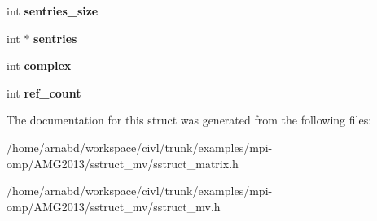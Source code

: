 \begin{DoxyCompactItemize}
\item 
\hypertarget{structhypre__SStructPMatrix_a423d9a3352a6af033e9e0a86a950365f}{}int {\bfseries sentries\+\_\+size}\label{structhypre__SStructPMatrix_a423d9a3352a6af033e9e0a86a950365f}

\item 
\hypertarget{structhypre__SStructPMatrix_a5994417873b971b4ec0cae0f9a2f2712}{}int $\ast$ {\bfseries sentries}\label{structhypre__SStructPMatrix_a5994417873b971b4ec0cae0f9a2f2712}

\item 
\hypertarget{structhypre__SStructPMatrix_ab6c60988eaf3e2bba1db4877bdac6088}{}int {\bfseries complex}\label{structhypre__SStructPMatrix_ab6c60988eaf3e2bba1db4877bdac6088}

\item 
\hypertarget{structhypre__SStructPMatrix_ab7d2b148ffecf7146647a79f8523179a}{}int {\bfseries ref\+\_\+count}\label{structhypre__SStructPMatrix_ab7d2b148ffecf7146647a79f8523179a}

\end{DoxyCompactItemize}


The documentation for this struct was generated from the following files\+:\begin{DoxyCompactItemize}
\item 
/home/arnabd/workspace/civl/trunk/examples/mpi-\/omp/\+A\+M\+G2013/sstruct\+\_\+mv/sstruct\+\_\+matrix.\+h\item 
/home/arnabd/workspace/civl/trunk/examples/mpi-\/omp/\+A\+M\+G2013/sstruct\+\_\+mv/sstruct\+\_\+mv.\+h\end{DoxyCompactItemize}
